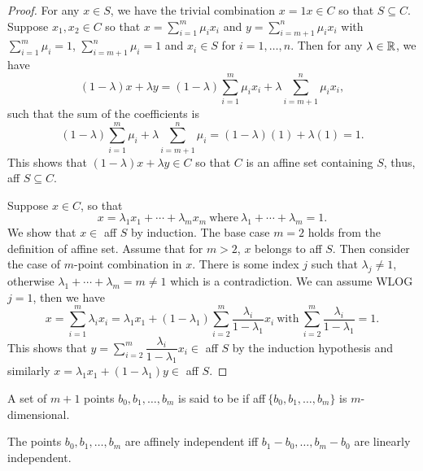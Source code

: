 \documentclass[11pt,a4paper]{article}
\begin{document}
\begin{proof}
    \forward For any $x\in S$, we have the trivial combination $x = 1x\in C$ so that $S\subseteq C$. Suppose $x_1,x_2\in C$ so that $x = \sum_{i=1}^m \mu_i x_i$ and $y = \sum_{i=m+1}^n \mu_i x_i$ with $\sum_{i = 1}^m\mu_i = 1$, $\sum_{i=m+1}^n \mu_i = 1$ and $x_i\in S$ for $i = 1,\ldots,n$. Then for any $\lambda\in\mathbb{R}$, we have
    \begin{equation*}
        (1-\lambda) x + \lambda y = (1-\lambda) \sum_{i=1}^m \mu_i x_i + \lambda \sum_{i=m+1}^n \mu_i x_i,
    \end{equation*}
    such that the sum of the coefficients is
    \begin{equation*}
        (1-\lambda) \sum_{i=1}^m \mu_i + \lambda \sum_{i=m+1}^n \mu_i = (1-\lambda) (1) + \lambda (1) = 1.
    \end{equation*}
    This shows that $(1-\lambda)x + \lambda y\in C$ so that $C$ is an affine set containing $S$, thus, aff $S\subseteq C$.

    \noindent \converse Suppose $x\in C$, so that 
    \begin{equation*}
        x = \lambda_1 x_1+\cdots +\lambda_m x_m\ \text{where}\ \lambda_1+\cdots +\lambda_m = 1.
    \end{equation*}
    We show that $x\in$ aff $S$ by induction. The base case $m = 2$ holds from the definition of affine set. Assume that for $m>2$, $x$ belongs to aff $S$. Then consider the case of $m$-point combination in $x$. There is some index $j$ such that $\lambda_j\neq 1$, otherwise $\lambda_1+\cdots+\lambda_m = m\neq 1$ which is a contradiction. We can assume WLOG $j=1$, then we have
    \begin{equation*}
        x = \sum_{i=1}^m \lambda_i x_i = \lambda_1 x_1 + (1-\lambda_1)\sum_{i=2}^m\dfrac{\lambda_i}{1-\lambda_1} x_i\ \text{with}\ \sum_{i=2}^m\dfrac{\lambda_i}{1-\lambda_1} = 1.
    \end{equation*}
    This shows that $y = \sum_{i=2}^m\dfrac{\lambda_i}{1-\lambda_1}x_i\in$ aff $S$ by the induction hypothesis and similarly $x = \lambda_1 x_1 + (1-\lambda_1) y\in$ aff $S$.
\end{proof}

\begin{definition}
    A set of $m+1$ points $b_0,b_1,\ldots, b_m$ is said to be  if aff$\ \{b_0,b_1,\ldots, b_m\}$ is $m$-dimensional.
\end{definition}

\begin{proposition}
    The points $b_0,b_1,\ldots, b_m$ are affinely independent iff $b_1-b_0, \ldots, b_m-b_0$ are linearly independent. 
\end{proposition}
\end{document}
